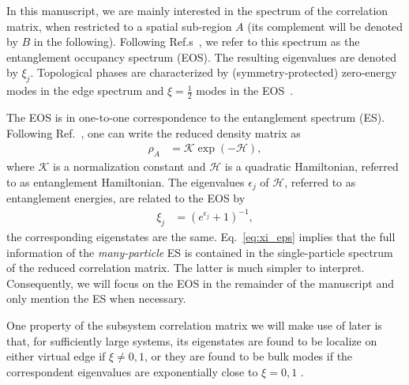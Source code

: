 \documentclass[twocolumn,amsmath,longbibliography,amssymb,superscriptaddress]{revtex4-1}
\begin{document}
In this manuscript, we are mainly interested in the spectrum of the correlation matrix, when restricted to a spatial sub-region $A$ (its complement will be denoted by $B$ in the following). 
Following Ref.s~\cite{Huang2012,Huang2012-2}, we refer to this spectrum as the entanglement occupancy spectrum (EOS). 
The resulting eigenvalues  are denoted by $\xi_j$. 
Topological phases are characterized by (symmetry-protected) zero-energy modes in the edge spectrum and $\xi=\frac 1 2$ modes in the EOS~\cite{Fidkowski2010entanglement}.
 

The EOS is in one-to-one correspondence to the entanglement spectrum (ES). 
Following Ref.~\cite{Peschel2003}, one can write the  reduced density matrix as 
\begin{align}\label{eq:red_dens_mat}
\rho_A&=\mathcal{K} \exp(-\mathcal H),
\end{align}
where $\mathcal{K}$ is a normalization constant and $\mathcal{H}$ is a quadratic Hamiltonian, referred to as entanglement Hamiltonian. 
The eigenvalues $\epsilon_j$ of $\mathcal{H}$, referred to as entanglement energies,  are related to the EOS by 
\begin{align}\label{eq:xi_eps}
\xi_j &=\left(e^{\epsilon_j}+1\right)^{-1}, 
\end{align}
the corresponding eigenstates are the same. 
Eq.~\eqref{eq:xi_eps} implies that the full information of the \emph{many-particle} ES is contained in the single-particle spectrum of the reduced correlation matrix. 
The latter is much simpler to interpret. 
Consequently, we will focus on the EOS in the remainder of the manuscript and only mention the ES when necessary. 

One property of the subsystem correlation matrix we will make use of later is that, for sufficiently large systems, its eigenstates are found to be localize on either virtual edge if $\xi \neq 0,1$, or they are found to be bulk modes if the correspondent eigenvalues are exponentially close to $\xi = 0,1$ \cite{Peschel2008}.
\end{document}
